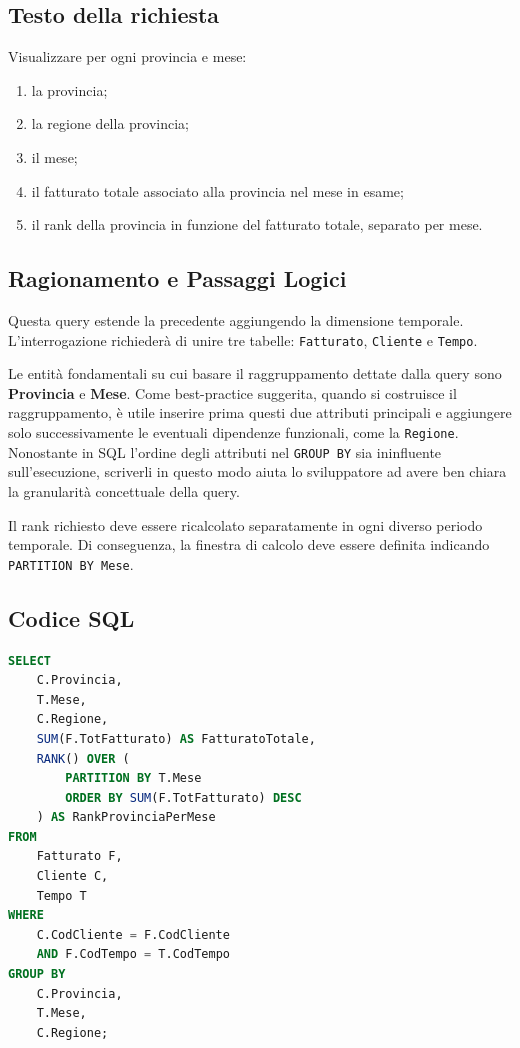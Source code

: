 \subsection{Testo della richiesta}
Visualizzare per ogni provincia e mese:
\begin{enumerate}
    \item la provincia;
    \item la regione della provincia;
    \item il mese;
    \item il fatturato totale associato alla provincia nel mese in esame;
    \item il rank della provincia in funzione del fatturato totale, separato per mese.
\end{enumerate}

\subsection{Ragionamento e Passaggi Logici}
Questa query estende la precedente aggiungendo la dimensione temporale. L'interrogazione richiederà di unire tre tabelle: \texttt{Fatturato}, \texttt{Cliente} e \texttt{Tempo}.

Le entità fondamentali su cui basare il raggruppamento dettate dalla query sono \textbf{Provincia} e \textbf{Mese}. Come best-practice suggerita, quando si costruisce il raggruppamento, è utile inserire prima questi due attributi principali e aggiungere solo successivamente le eventuali dipendenze funzionali, come la \texttt{Regione}. Nonostante in SQL l'ordine degli attributi nel \texttt{GROUP BY} sia ininfluente sull'esecuzione, scriverli in questo modo aiuta lo sviluppatore ad avere ben chiara la granularità concettuale della query.

Il rank richiesto deve essere ricalcolato separatamente in ogni diverso periodo temporale. Di conseguenza, la finestra di calcolo deve essere definita indicando \texttt{PARTITION BY Mese}.

\subsection{Codice SQL}
\begin{lstlisting}[language=SQL, basicstyle=\ttfamily\small, keywordstyle=\color{blue}, stringstyle=\color{red}, commentstyle=\color{green!60!black}]
SELECT 
    C.Provincia,
    T.Mese,
    C.Regione,
    SUM(F.TotFatturato) AS FatturatoTotale,
    RANK() OVER (
        PARTITION BY T.Mese
        ORDER BY SUM(F.TotFatturato) DESC
    ) AS RankProvinciaPerMese
FROM 
    Fatturato F, 
    Cliente C, 
    Tempo T
WHERE 
    C.CodCliente = F.CodCliente 
    AND F.CodTempo = T.CodTempo
GROUP BY 
    C.Provincia, 
    T.Mese, 
    C.Regione;
\end{lstlisting}

